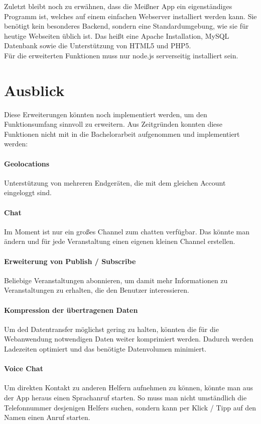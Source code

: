 Zuletzt bleibt noch zu erwähnen, dass die Meißner App ein eigenständiges Programm ist, welches auf einem einfachen Webserver installiert werden kann. Sie benötigt kein besonderes Backend, sondern eine Standardumgebung, wie sie für heutige Webseiten üblich ist. Das heißt eine Apache Installation, MySQL Datenbank sowie die Unterstützung von HTML5 und PHP5.\\
Für die erweiterten Funktionen muss nur node.js serverseitig installiert sein.



\section{Ausblick}
Diese Erweiterungen könnten noch implementiert werden, um den Funktionsumfang sinnvoll zu erweitern. Aus Zeitgründen konnten diese Funktionen nicht mit in die Bachelorarbeit aufgenommen und implementiert werden:

\paragraph{Geolocations}
Unterstützung von mehreren Endgeräten, die mit dem gleichen Account eingeloggt sind.

\paragraph{Chat}
Im Moment ist nur ein großes Channel zum chatten verfügbar. Das könnte man ändern und für jede Veranstaltung einen eigenen kleinen Channel erstellen.

\paragraph{Erweiterung von Publish / Subscribe}
Beliebige Veranstaltungen abonnieren, um damit mehr Informationen zu Veranstaltungen zu erhalten, die den Benutzer interessieren.

\paragraph{Kompression der übertragenen Daten}
Um ded Datentransfer möglichst gering zu halten, könnten die für die Webanwendung notwendigen Daten weiter komprimiert werden. Dadurch werden Ladezeiten optimiert und das benötigte Datenvolumen minimiert.

\paragraph{Voice Chat}
Um direkten Kontakt zu anderen Helfern aufnehmen zu können, könnte man aus der App heraus einen Sprachanruf starten. So muss man nicht umständlich die Telefonnummer desjenigen Helfers suchen, sondern kann per Klick / Tipp auf den Namen einen Anruf starten.



